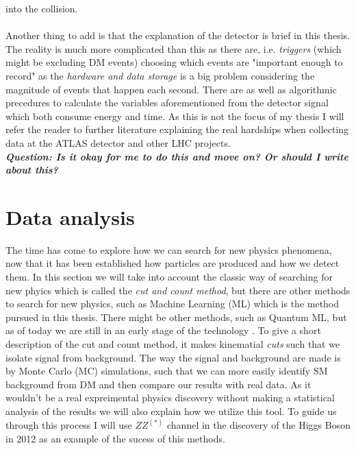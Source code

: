 \documentclass[12pt, a4paper]{book}
\begin{document}
into the collision. \\
\\Another thing to add is that the explanation of the detector is brief in this thesis. The reality is much more complicated than this as there are, i.e. \textit{triggers} (which might be excluding DM events) choosing which events are 
"important enough to record" as the \textit{hardware and data storage} is a big problem considering the magnitude of events that happen each second. There are as well as algorithmic precedures to calculate the variables aforementioned from the detector signal 
which both consume energy and time. As this is not the focus of my thesis I will refer the reader to further literature explaining the real hardships when collecting data at the ATLAS detector and other LHC projects. \cite{Trigger_1}\\
\textit{\textbf{Question: Is it okay for me to do this and move on? Or should I write about this?}}





\clearpage
\section{Data analysis}\label{sec:data_anal}
The time has come to explore how we can search for new physics phenomena, now that it has been established how particles are produced and how we detect them. In this section we will take into account the classic way of searching for new phyics which is called 
the \textit{cut and count method}, but there are other methods to search for new physics, such as Machine Learning (ML) which is the method pursued in this thesis. There might be other methods, such as 
Quantum ML, but as of today we are still in an early stage of the technology \cite{QML}. To give a short description of the cut and count method, it makes kinematial \textit{cuts} such that we isolate signal from background. The way 
the signal and background are made is by Monte Carlo (MC) simulations, such that we can more easily identify SM background from DM and then compare our results with real data. As it wouldn't be a real expreimental physics discovery without making a statistical 
analysis of the results we will also explain how we utilize this tool. To guide us through this process I will use $ZZ^{(*)}$ channel in the discovery of the Higgs Boson in 2012 \cite{Higgs_discovery_2012} as an example of the sucess of this methods.
\end{document}
